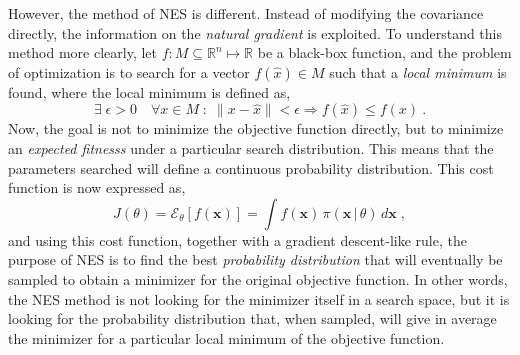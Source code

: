 However, the method of NES is different. Instead of modifying the covariance directly, the 
information on the \emph{natural gradient} is exploited. To understand this method more 
clearly, let \(f \colon M \subseteq \mathbb{R}^n \mapsto \mathbb{R}\) be a black-box 
function, and the problem of optimization is to search for a vector \(f(\hat{x}) \in M\) 
such that a \emph{local minimum} is found, where the local minimum is defined as,
\begin{equation}
    \exists \; \epsilon > 0 \quad \forall x \in M \; \colon \; 
    \lVert x - \hat{x} \rVert < \epsilon \Rightarrow f(\hat{x}) \leq f(x)
    \: .
    \label{eq:local-minimizer}
\end{equation}
Now, the goal is not to minimize the objective function directly, but to minimize an \emph{expected fitnesss} under a particular search distribution. This means that the parameters searched will define a continuous probability distribution. This cost function is now expressed as,
\begin{equation}
    J(\theta) = \mathcal{E}_{\theta} \left[ f(\bm{x}) \right] = 
    \int f(\bm{x}) \, \pi (\bm{x} \, \vert \, \theta) \, d \bm{x}
    \; ,
    \label{eq:expected-fitness}
\end{equation}
and using this cost function, together with a gradient descent-like rule, the purpose of NES is to find the best 
\emph{probability distribution} that will eventually be sampled to obtain a minimizer for 
the original objective function. In other words, the NES method is not looking for the 
minimizer itself in a search space, but it is looking for the probability distribution 
that, when sampled, will give in average the minimizer for a particular local minimum of 
the objective function.

